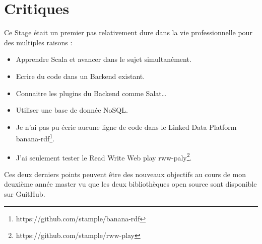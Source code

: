 \chapter{Critiques}

Ce Stage était un premier pas relativement dure dans la vie professionnelle pour des multiples raisons :
\begin{itemize}
\item Apprendre Scala et avancer dans le sujet simultanément.

\item Ecrire du code dans un Backend existant.

\item Connaitre les plugins du Backend comme Salat…

\item Utiliser une base de donnée NoSQL.

\item Je n'ai pas pu écrie aucune ligne de code dans le Linked Data Platform banana-rdf\footnote{https://github.com/stample/banana-rdf}.

\item J'ai seulement tester le Read Write Web play rww-paly\footnote{https://github.com/stample/rww-play}.


\end{itemize}

Ces deux derniers points peuvent être des nouveaux objectifs au cours de mon deuxième année master vu que les deux bibliothèques open source sont disponible sur GuitHub.  
